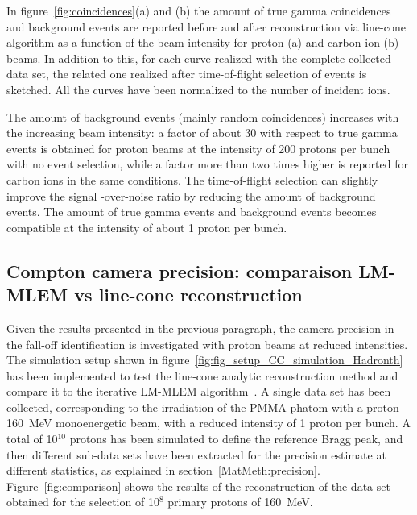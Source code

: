 In figure~\ref{fig:coincidences}(a) and (b) the amount of true gamma coincidences and background events are reported before and after reconstruction via line-cone algorithm as a function of the beam intensity for proton (a) and carbon ion (b) beams. In addition to this, for each curve realized with the complete collected data set, the related one realized after time-of-flight selection of events is sketched. All the curves have been normalized to the number of incident ions.

The amount of background events (mainly random coincidences) increases with the increasing beam intensity: a factor of about 30 with respect to true gamma events is obtained for proton beams at  the intensity of 200 protons per bunch with no event selection, while a factor more than two times higher is reported for carbon ions in the same conditions. The time-of-flight selection can slightly improve the signal -over-noise ratio by reducing the amount of background events. The amount of true gamma events and background events becomes compatible at the intensity of about 1 proton per bunch.


\subsection{Compton camera precision: comparaison LM-MLEM vs line-cone reconstruction}
\label{Results::precision_reconstruction}
Given the results presented in the previous paragraph, the camera precision in the fall-off identification is investigated with proton beams at reduced intensities.\\
The simulation setup shown in figure~\ref{fig:fig_setup_CC_simulation_Hadronth} has been implemented to test the line-cone analytic reconstruction method and compare it to the iterative LM-MLEM algorithm~\cite{maxim_filtered_2014,hilaire_compton_2014}. A single data set has been collected, corresponding to the irradiation of the PMMA phatom with a proton 160~MeV monoenergetic beam, with a reduced intensity of 1 proton per bunch. A total of 10$^{10}$ protons has been simulated to define the reference Bragg peak, and then different sub-data sets have been extracted for the precision estimate at different statistics, as explained in section~\ref{MatMeth:precision}. 
Figure~\ref{fig:comparison} shows the results of the reconstruction of the data set obtained for the selection of 10$^8$ primary protons of 160~MeV.

